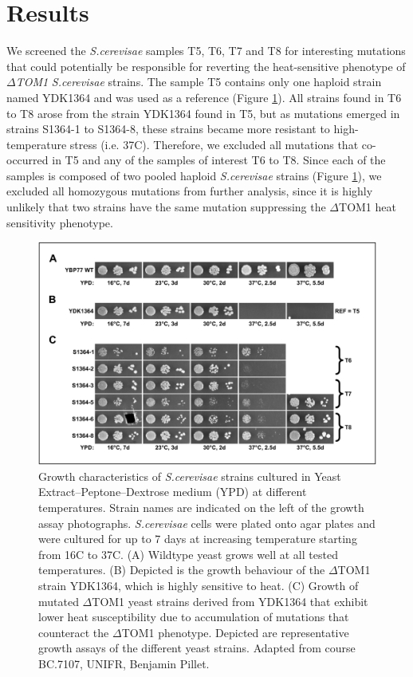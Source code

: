 \documentclass[10pt,a4paper]{article}
\begin{document}
\section*{\large Results}
We screened the \textit{S.cerevisae} samples T5, T6, T7 and T8 for interesting mutations that could potentially be responsible for reverting the heat-sensitive phenotype of \textit{$\Delta$TOM1} \textit{S.cerevisae} strains. The sample T5 contains only one haploid strain named YDK1364 and was used as a reference (Figure \ref{fig:yeastgrowth}). All strains found in T6 to T8 arose from the strain YDK1364 found in T5, but as mutations emerged in strains S1364-1 to S1364-8, these strains became more resistant to high-temperature stress (i.e. 37\degree C). Therefore, we excluded all mutations that co-occurred in T5 and any of the samples of interest T6 to T8. Since each of the samples is composed of two pooled haploid \textit{S.cerevisae} strains (Figure \ref{fig:yeastgrowth}), we excluded all homozygous mutations from further analysis, since it is highly unlikely that two strains have the same mutation suppressing the $\Delta$TOM1 heat sensitivity phenotype.

\begin{figure}[h]
	\centering
	\includegraphics[width=0.7\linewidth]{img/yeastgrowth}
	\caption{\small Growth characteristics of \textit{S.cerevisae} strains cultured in Yeast Extract–Peptone–Dextrose medium (YPD) at different temperatures. Strain names are indicated on the left of the growth assay photographs. \textit{S.cerevisae} cells were plated onto agar plates and were cultured for up to 7 days at increasing temperature starting from 16\degree C to 37\degree C. (A) Wildtype yeast grows well at all tested temperatures. (B) Depicted is the growth behaviour of the $\Delta$TOM1 strain YDK1364, which is highly sensitive to heat. (C) Growth of mutated $\Delta$TOM1 yeast strains derived from YDK1364 that exhibit lower heat susceptibility due to accumulation of mutations that counteract the $\Delta$TOM1 phenotype. Depicted are representative growth assays of the different yeast strains. Adapted from course BC.7107, UNIFR, Benjamin Pillet.}
	\label{fig:yeastgrowth}
\end{figure}
\end{document}
